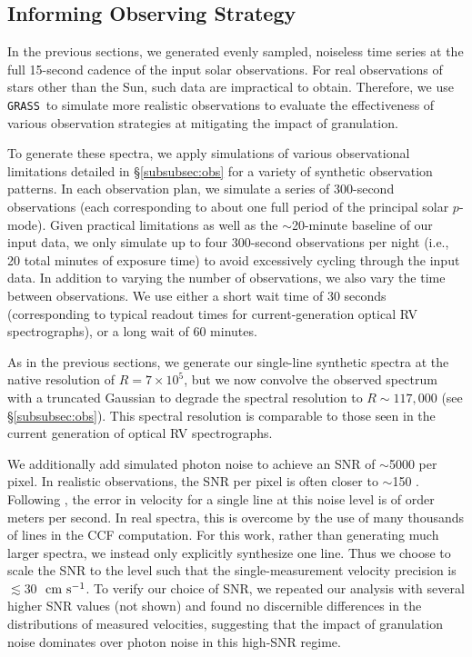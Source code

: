 \documentclass[twocolumn]{aastex63}
\newcommand{\cms}{\ {\rm cm\ s}^{-1}}
\newcommand{\grass}{\texttt{GRASS}}
\newcommand{\revise}[1]{#1}
\newcommand{\revisetwo}[1]{#1}
\begin{document}

\subsection{Informing Observing Strategy} \label{subsec:obs_strat}

In the previous sections, we generated evenly sampled, noiseless time series at the full 15-second cadence of the input solar observations. For real observations of stars other than the Sun, such data are impractical to obtain. Therefore, we use \grass\ to simulate more realistic observations to evaluate the effectiveness of various observation strategies at mitigating the impact of granulation. \par

To generate these spectra, we apply simulations of various observational limitations detailed in \S\ref{subsubsec:obs} for a variety of synthetic observation patterns. In each observation plan, we simulate a series of \revisetwo{300}-second observations (each corresponding to about \revisetwo{one full period} of the principal solar $p$-mode). Given practical limitations as well as the $\sim$20-minute baseline of our input data, we only simulate up to four \revisetwo{300}-second observations per night (i.e., \revisetwo{20} total minutes of exposure time) \revise{to avoid excessively cycling through the input data.} In addition to varying the number of observations, we also vary the time between observations. We use either a short wait time of 30 seconds (corresponding to typical readout \revise{times for current-generation optical RV spectrographs}), or a long wait of \revise{60 minutes}. \par 

As in the previous sections, we generate our single-line synthetic spectra at the native resolution of $R=7\times10^{5}$, but we now convolve the observed spectrum with a truncated Gaussian to degrade the spectral resolution to $R \sim 117,000$ (see \S\ref{subsubsec:obs}). This spectral resolution is comparable to those seen in the current generation of optical RV spectrographs. \par 

We additionally add simulated photon noise to achieve an SNR of \revise{$\sim$5000} per pixel. In realistic observations, the SNR per pixel is often closer to $\sim$150 \citep{Gupta2021}. Following \citet{Murphy2007}, the error in velocity for a single line at this noise level is of order meters per second. In real spectra, this is overcome by the use of many thousands of lines in the CCF computation. For this work, rather than generating much larger spectra, we instead only explicitly synthesize one line. Thus we choose to scale the SNR to the level such that the single-measurement velocity precision is \revise{$\lesssim$30 $\cms$}. To verify our choice of SNR, we repeated our analysis with several higher SNR values (not shown) and found no discernible differences in the distributions of measured velocities, suggesting that the impact of granulation noise dominates over photon noise in this high-SNR regime. \par
\end{document}
